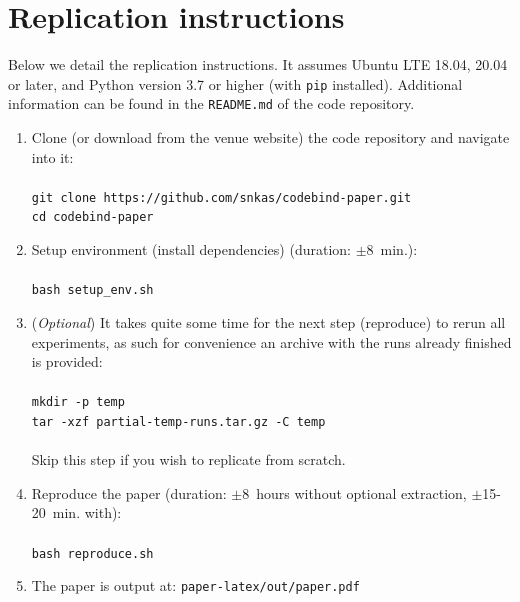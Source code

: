 \clearpage
\section{Replication instructions}

Below we detail the replication instructions. It assumes Ubuntu LTE 18.04, 20.04 or later, and Python version 3.7 or higher (with \texttt{pip} installed). Additional information can be found in the \texttt{README.md} of the code repository.

\begin{enumerate}
    \item Clone (or download from the venue website) the code repository and navigate into it:\\
    \\
    \texttt{git clone https://github.com/snkas/codebind-paper.git}\\
    \texttt{cd codebind-paper}\\

    \item Setup environment (\ie install dependencies) (duration: $\pm$8~min.):\\
    \\
    \texttt{bash setup\_env.sh}\\

    \item (\textit{Optional}) It takes quite some time for the next step (reproduce) to rerun all experiments, as such for convenience an archive with the runs already finished is provided:\\
    \\
    \texttt{mkdir -p temp}\\
    \texttt{tar -xzf partial-temp-runs.tar.gz -C temp}\\
    \\
    Skip this step if you wish to replicate from scratch.\\

    \item Reproduce the paper (duration: $\pm$8~hours without optional extraction, $\pm$15-20~min. with):\\
    \\
    \texttt{bash reproduce.sh}\\

    \item The paper is output at: \texttt{paper-latex/out/paper.pdf}\\

\end{enumerate}

